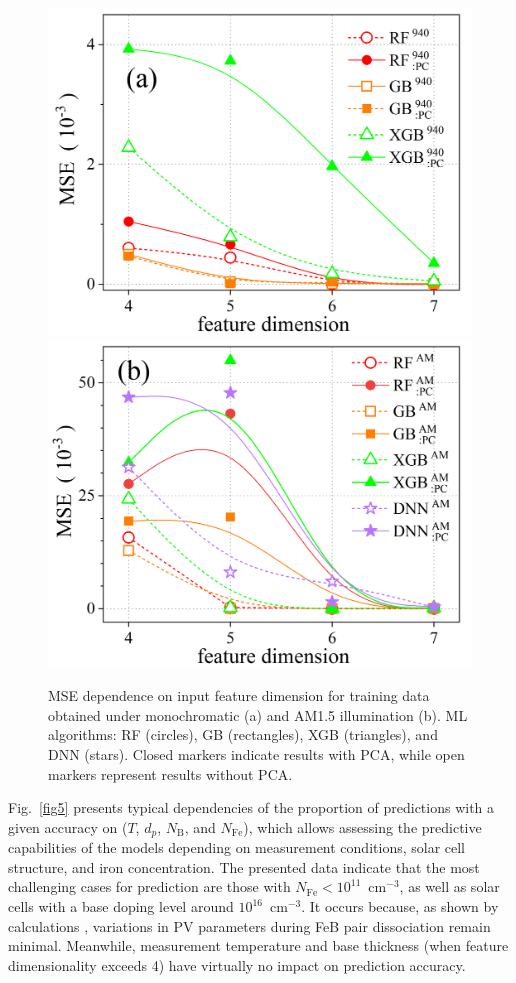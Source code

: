 \documentclass[a4paper,fleqn]{cas-sc}
\begin{document}
\begin{figure}
	\centering
     \includegraphics[width=0.4\linewidth]{Fig4a.png}
     \includegraphics[width=0.4\linewidth]{Fig4b.png}
	  \caption{MSE dependence on input feature dimension for training data obtained under monochromatic (a) and AM1.5 illumination (b). ML algorithms: RF (circles), GB (rectangles), XGB (triangles), and DNN (stars). Closed markers indicate results with PCA, while open markers represent results without PCA.
}\label{fig4}
\end{figure}


Fig.~\ref{fig5} presents typical dependencies of the proportion of predictions with a given accuracy on ($T$, $d_p$, $N_\mathrm{B}$, and $N_\mathrm{Fe}$), which allows assessing the predictive capabilities of the models depending on measurement conditions, solar cell structure, and iron concentration. 
The presented data indicate that the most challenging cases for prediction are those with $N_\mathrm{Fe}<10^{11}$~cm$^{-3}$, as well as solar cells with a base doping level around $10^{16}$~cm$^{-3}$. 
It occurs because, as shown by calculations \cite{OLIKH2025MSEB}, variations in PV parameters during FeB pair dissociation remain minimal. 
Meanwhile, measurement temperature and base thickness (when feature dimensionality exceeds 4) have virtually no impact on prediction accuracy.
\end{document}
